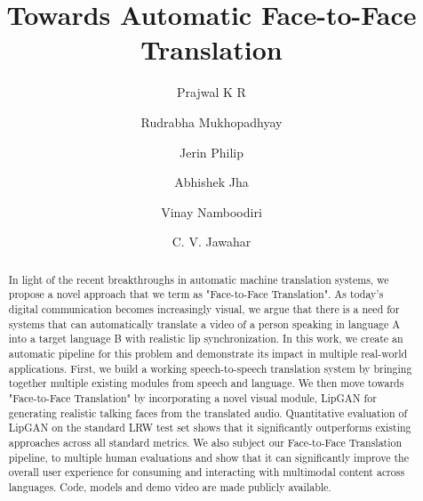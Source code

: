 \documentclass[sigconf]{acmart}
\begin{document}
\fancyhead{}



\title{Towards Automatic Face-to-Face Translation}
\author{Prajwal K R}

\author{Rudrabha Mukhopadhyay}
\authornotemark[1]

\author{Jerin Philip}
 
\author{Abhishek Jha}

\author{Vinay Namboodiri}

\author{C. V. Jawahar}
 


\renewcommand{\shortauthors}{Prajwal and Rudrabha, et al.}

\begin{abstract}
In light of the recent breakthroughs in automatic machine translation systems, we propose a novel approach that we term as "Face-to-Face Translation". As today's digital communication becomes increasingly visual, we argue that there is a need for systems that can automatically translate a video of a person speaking in language A into a target language B with realistic lip synchronization. In this work, we create an automatic pipeline for this problem and demonstrate its impact in multiple real-world applications. First, we build a working speech-to-speech translation system by bringing together multiple existing modules from speech and language. We then move towards "Face-to-Face Translation" by incorporating a novel visual module, LipGAN for generating realistic talking faces from the translated audio. Quantitative evaluation of LipGAN on the standard LRW test set shows that it significantly outperforms existing approaches across all standard metrics. We also subject our Face-to-Face Translation pipeline, to multiple human evaluations and show that it can significantly improve the overall user experience for consuming and interacting with multimodal content across languages. Code, models and demo video are made publicly available.
\end{abstract}
\end{document}

